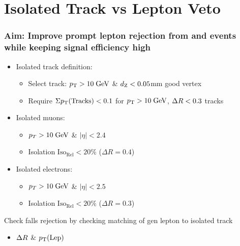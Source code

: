 \documentclass{beamer}
\begin{document}
\section{Isolated Track vs Lepton Veto }
\begin{frame}
\frametitle{Aim: Improve prompt lepton rejection from  \ttbar and \wpj events while keeping signal efficiency high}
 \begin{itemize}
  \item Isolated track definition:
  \begin{itemize}
  \item Select track: $p_{\text{T}}>10\;\text{Ge}\kern-0.06667em\text{V}$ \& $d_{\text{Z}}<0.05$mm good vertex
   \item Require $\Sigma p_{\text{T}}(\text{Tracks})<0.1$ for $p_{\text{T}}>10\;\text{Ge}\kern-0.06667em\text{V}$, $\Delta R<0.3$ tracks
  \end{itemize}
  \item Isolated muons: 
  \begin{itemize}
   \item $p_{T}>10 \;\text{Ge}\kern-0.06667em\text{V}$ \& $|\eta|<2.4$ 
   \item  Isolation $\text{Iso}_{\text{Rel}}<20\%$ ($\Delta R=0.4$) 
  \end{itemize}
    \item Isolated electrons: 
  \begin{itemize}
   \item $p_{T}>10 \;\text{Ge}\kern-0.06667em\text{V}$ \& $|\eta|<2.5$ 
   \item  Isolation $\text{Iso}_{\text{Rel}}<20\%$ ($\Delta R=0.3$) 
  \end{itemize}

 \end{itemize}
 Check falls rejection by checking matching of gen lepton to isolated track
 \begin{itemize}
  \item $\Delta R$ \& $p_{\text{T}}(\text{Lep})$
 \end{itemize}


\end{frame}



\end{document}
